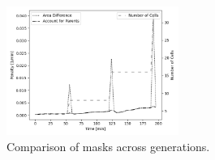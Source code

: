 \documentclass{article}
\begin{document}
\begin{figure}
    \centering
    \includegraphics[width=0.5\textwidth]
        {../docs/source/_static/fitting-methods/penalty-time-flow.png}%
    \caption{Comparison of masks across generations.}
    \label{fig:penalty-calculation-cell-division}
\end{figure}



\end{document}
